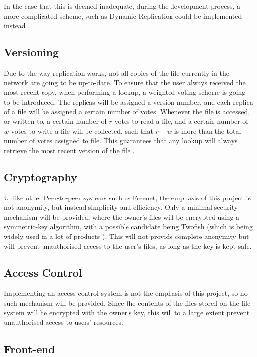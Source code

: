 \documentclass[8pt,a4paper]{article}
\begin{document}
In the case that this is deemed inadequate, during the development process, a more complicated scheme, such as Dynamic Replication could be implemented instead \cite{dhash}.

\subsection{Versioning}
Due to the way replication works, not all copies of the file currently in the network are going to be up-to-date. To ensure that the user always received the most recent copy, when performing a lookup, a weighted voting scheme is going to be introduced. The replicas will be assigned a version number, and each replica of a file will be assigned a certain number of votes. Whenever the file is accessed, or written to, a certain number of $r$ votes to read a file, and a certain number of $w$ votes to write a file will be collected, such that $r + w$ is more than the total number of votes assigned to file. This guarantees that any lookup will always retrieve the most recent version of the file \cite{versioning}.

\subsection{Cryptography}

Unlike other Peer-to-peer systems such as Freenet, the emphasis of this project is not anonymity, but instead simplicity and efficiency. Only a minimal security mechanism will be provided, where the owner's files will be encrypted using a symmetric-key algorithm, with a possible candidate being Twofish (which is being widely used in a lot of products \cite{twofishprod}).
This will not provide complete anonymity but will prevent unauthorised access to the user's files, as long as the key is kept safe.

\subsection{Access Control}

Implementing an access control system is not the emphasis of this project, so no such mechanism will be provided. Since the contents of the files stored on the file system will be encrypted with the owner's key, this will to a large extent prevent unauthorised access to users' resources.

\subsection{Front-end}
\end{document}
